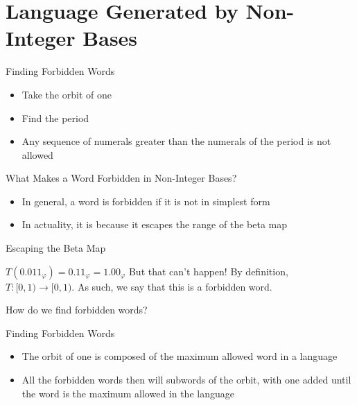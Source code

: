 \documentclass{beamer}
\begin{document}
            \section{Language Generated by Non-Integer Bases}
            \begin{frame}{Finding Forbidden Words}
              \begin{itemize}
                \item Take the orbit of one
                \item Find the period
                \item Any sequence of numerals greater than the numerals of the period is not allowed
              \end{itemize}
            \end{frame}

            \begin{frame}{What Makes a Word Forbidden in Non-Integer Bases?}
              \begin{itemize}
                \item In general, a word is forbidden if it is not in simplest form
                \item In actuality, it is because it escapes the range of the beta map
              \end{itemize}
            \end{frame}

            \begin{frame}{Escaping the Beta Map}
              \begin{example}[$T(0.011_\varphi)$]
                $T(0.011_\varphi)=0.11_\varphi=1.00_\varphi$
                But that can't happen! By definition, $T:[0,1)\to[0,1)$. As such, we say that this is a forbidden word.

                How do we find forbidden words?
              \end{example}
            \end{frame}

            \begin{frame}{Finding Forbidden Words}
              \begin{itemize}
                \item The orbit of one is composed of the maximum allowed word in a language
                \item All the forbidden words then will subwords of the orbit, with one added until the word is the maximum allowed in the language
              \end{itemize}
            \end{frame}
\end{document}
